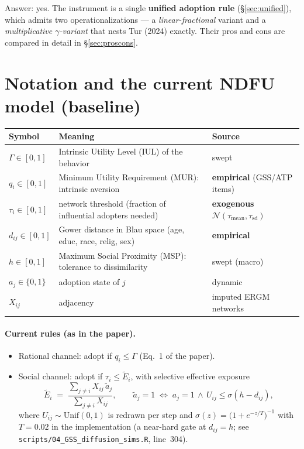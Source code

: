 \documentclass[11pt,a4paper]{article}
\newcommand{\Ee}{\tilde{E}}                 %
\newcommand{\atil}{\tilde{a}}               %
\newcommand{\code}[1]{\texttt{#1}}
\begin{document}
Answer: yes. The instrument is a single \textbf{unified adoption rule}
(\S\ref{sec:unified}), which admits two operationalizations --- a
\emph{linear-fractional} variant and a \emph{multiplicative $\gamma$-variant} that nests
Tur (2024) exactly. Their pros and cons are compared in detail in
\S\ref{sec:proscons}.

\section{Notation and the current NDFU model (baseline)}
\label{sec:notation}

\begin{center}
\small
\begin{tabular}{@{}lll@{}}
\toprule
Symbol & Meaning & Source \\
\midrule
$\Gamma \in [0,1]$ & Intrinsic Utility Level (IUL) of the behavior & swept \\
$q_i \in [0,1]$ & Minimum Utility Requirement (MUR): intrinsic aversion & \textbf{empirical} (GSS/ATP items) \\
$\tau_i \in [0,1]$ & network threshold (fraction of influential adopters needed) & \textbf{exogenous} $\mathcal{N}(\tau_{\text{mean}}, \tau_{\text{sd}})$ \\
$d_{ij} \in [0,1]$ & Gower distance in Blau space (age, educ, race, relig, sex) & \textbf{empirical} \\
$h \in [0,1]$ & Maximum Social Proximity (MSP): tolerance to dissimilarity & swept (macro) \\
$a_j \in \{0,1\}$ & adoption state of $j$ & dynamic \\
$X_{ij}$ & adjacency & imputed ERGM networks \\
\bottomrule
\end{tabular}
\end{center}

\paragraph{Current rules (as in the paper).}
\begin{itemize}
  \item Rational channel: adopt if $q_i \le \Gamma$ (Eq.~1 of the paper).
  \item Social channel: adopt if $\tau_i \le \Ee_i$, with selective effective exposure
\begin{equation}
  \Ee_i \;=\; \frac{\sum_{j\neq i} X_{ij}\,\atil_j}{\sum_{j\neq i} X_{ij}},
  \qquad
  \atil_j = 1 \;\iff\; a_j = 1 \,\wedge\, U_{ij} \le \sigma(h - d_{ij}),
  \label{eq:exposure}
\end{equation}
  where $U_{ij} \sim \mathrm{Unif}(0,1)$ is redrawn per step and
  $\sigma(z) = \bigl(1 + e^{-z/T}\bigr)^{-1}$ with $T = 0.02$ in the implementation
  (a near-hard gate at $d_{ij} = h$; see \code{scripts/04\_GSS\_diffusion\_sims.R},
  line~304).
\end{itemize}
\end{document}
